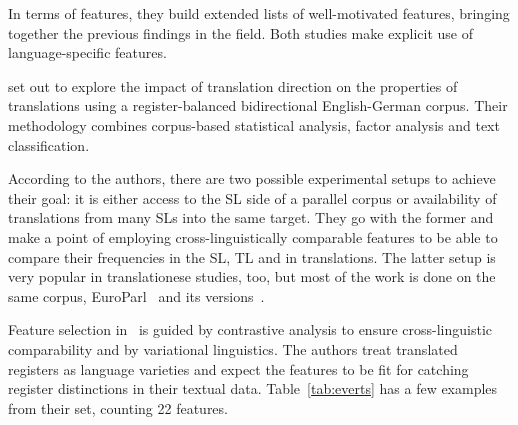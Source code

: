 In terms of features, they build extended lists of well-motivated features, bringing together the previous findings in the field. Both studies make explicit use of language-specific features. 

\citet{Evert2017} set out to explore the impact of translation direction on the properties of translations using a register-balanced bidirectional English-German corpus. Their methodology combines corpus-based statistical analysis, factor analysis and text classification.

According to the authors, there are two possible experimental setups to achieve their goal: it is either access to the SL side of a parallel corpus or availability of translations from many SLs into the same target. They go with the former and make a point of employing cross-linguistically comparable features to be able to compare their frequencies in the SL, TL and in translations. 
The latter setup is very popular in translationese studies, too, but most of the work is done on the same corpus, EuroParl~\cite{Koehn2005} and its versions~\cite[to name just a few]{VanHalteren2008,Koppel2011,Carter2012,Volansky2012,Lembersky2013,Rabinovich2017}.

Feature selection in~\citet{Evert2017} is guided by contrastive analysis to ensure cross-linguistic comparability and by variational linguistics. The authors treat translated registers as language varieties and expect the features to be fit for catching register distinctions in their textual data. Table~\ref{tab:everts} has a few examples from their set, counting 22 features.

